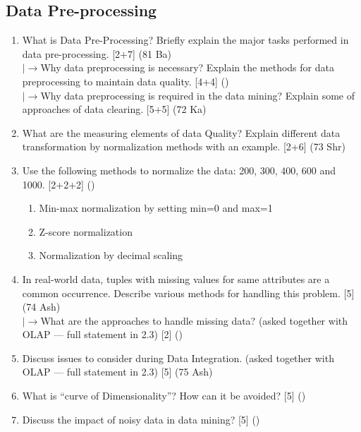 \documentclass[12pt]{article}
\newcommand{\lb}{\\$\left|\rightarrow\right.$}
\begin{document}
  \subsection{Data Pre-processing}
    \begin{enumerate}[topsep=0pt, noitemsep]
      \item What is Data Pre-Processing? Briefly explain the major tasks performed in data pre-processing. \hfill [2+7] (81 Ba)
        \lb Why data preprocessing is necessary? Explain the methods for data preprocessing to maintain data quality. \hfill [4+4] ()
        \lb Why data preprocessing is required in the data mining? Explain some of approaches of data clearing. \hfill [5+5] (72 Ka)

      \item What are the measuring elements of data Quality? Explain different data transformation by normalization methods with an example. \hfill [2+6] (73 Shr)

      \item Use the following methods to normalize the data: 200, 300, 400, 600 and 1000. \hfill [2+2+2] ()
        \begin{enumerate}[label=\alph*),topsep=0pt,noitemsep]
          \item Min-max normalization by setting min=0 and max=1
          \item Z-score normalization
          \item Normalization by decimal scaling
        \end{enumerate}

      \item In real-world data, tuples with missing values for same attributes are a common occurrence. Describe various methods for handling this problem. \hfill [5] (74 Ash)
        \lb What are the approaches to handle missing data? (asked together with OLAP --- full statement in 2.3) \hfill [2] ()

      \item Discuss issues to consider during Data Integration. (asked together with OLAP --- full statement in 2.3) \hfill [5] (75 Ash)

      \item What is ``curve of Dimensionality''? How can it be avoided? \hfill [5] ()

      \item Discuss the impact of noisy data in data mining? \hfill [5] ()


\end{enumerate}
\end{document}
